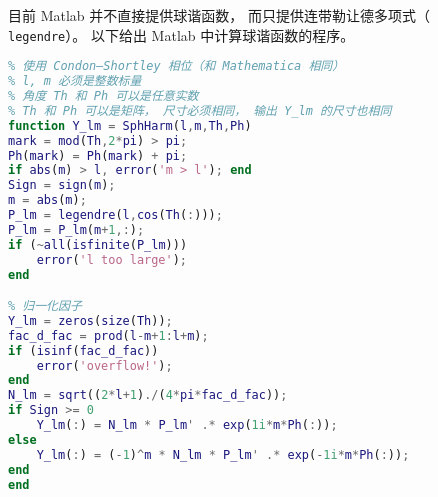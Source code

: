 
目前 Matlab 并不直接提供球谐函数， 而只提供连带勒让德多项式（ \lstinline|legendre|）。 以下给出 Matlab 中计算球谐函数的程序。

\begin{lstlisting}[language=matlab, caption=SphHarm.m]
% 计算球谐函数 Y_{lm}
% 使用 Condon–Shortley 相位（和 Mathematica 相同）
% l, m 必须是整数标量
% 角度 Th 和 Ph 可以是任意实数
% Th 和 Ph 可以是矩阵， 尺寸必须相同， 输出 Y_lm 的尺寸也相同
function Y_lm = SphHarm(l,m,Th,Ph)
mark = mod(Th,2*pi) > pi;
Ph(mark) = Ph(mark) + pi;
if abs(m) > l, error('m > l'); end
Sign = sign(m);
m = abs(m);
P_lm = legendre(l,cos(Th(:)));
P_lm = P_lm(m+1,:);
if (~all(isfinite(P_lm)))
    error('l too large');
end

% 归一化因子
Y_lm = zeros(size(Th));
fac_d_fac = prod(l-m+1:l+m);
if (isinf(fac_d_fac))
    error('overflow!');
end
N_lm = sqrt((2*l+1)./(4*pi*fac_d_fac));
if Sign >= 0
    Y_lm(:) = N_lm * P_lm' .* exp(1i*m*Ph(:));
else
    Y_lm(:) = (-1)^m * N_lm * P_lm' .* exp(-1i*m*Ph(:));
end
end
\end{lstlisting}
